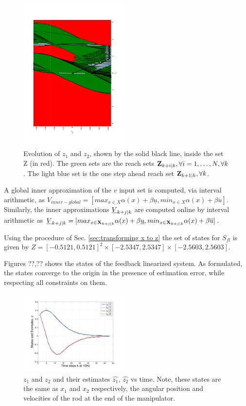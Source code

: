 \begin{figure}
	\includegraphics[angle=270,width=0.49\textwidth]{figs/z_trajectory_new.pdf}
	\caption{Evolution of $z_1$ and $z_2$, shown by the solid black line, inside the set Z (in red). The green sets are the reach sets $\mathbf{Z}_{k+i|k},\forall i=1,\dotsc,N, \forall k$. The light blue set is the one step ahead reach set $\mathbf{Z}_{k+1|k},\forall k$.}
	\label{fig:z_new_toy}
\end{figure}

A global inner approximation of the $v$ input set is computed, via interval arithmetic, as $V_{inner-global} = [max_{x\in X}\alpha(x) + \beta \underline{u}, min_{x\in X}\alpha(x) + \beta \overline{u}]$. 
Similarly, the inner approximations $\underline{V}_{k+j|k}$ are computed online by interval arithmetic as $\underline{V}_{k+j|k} = [max_{x\in \mathbf{X}_{k+j|k}} \alpha(x) + \beta \underline{u},  min_{x\in \mathbf{X}_{k+j|k}}\alpha(x) + \beta \overline{u}]$. 

Using the procedure of Sec. \ref{sec:transforming x to z} the set of states for $S_{fl}$ is given by $Z = [-0.5121, 0.5121]^2 \times [-2.5347, 2.5347] \times [-2.5603, 2.5603]$.

Figures ??,?? shows the states of the feedback linearized system. As formulated, the states converge to the origin in the presence of estimation error, while respecting all constraints on them.

\begin{figure}
\includegraphics[width=0.49\textwidth]{figs/z_1n2_manip.pdf}
\caption{$z_1$ and $z_2$ and their estimates $\hat{z_1}, \, \hat{z_2}$ vs time. Note, these states are the same as $x_1$ and $x_2$ respectively, the angular position and velocities of the rod at the end of the manipulator.}
\label{fig:z_12}
\end{figure}

